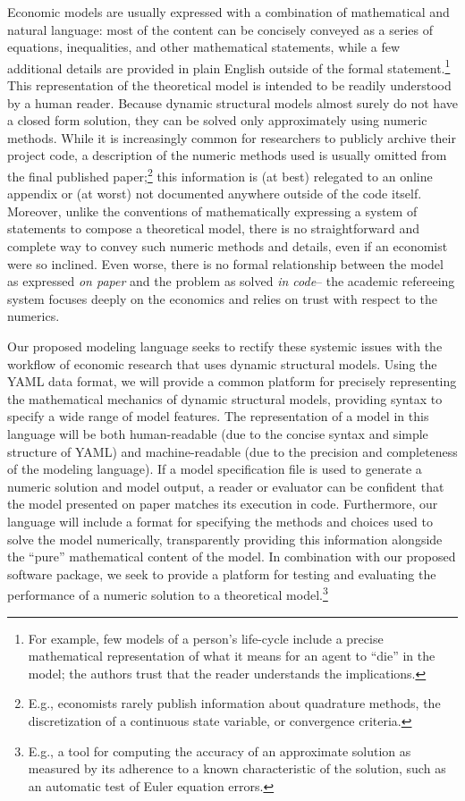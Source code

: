 \documentclass[12pt,pdftex,letterpaper]{article}
\begin{document}
Economic models are usually expressed with a combination of mathematical and natural language: most of the content can be concisely conveyed as a series of equations, inequalities, and other mathematical statements, while a few additional details are provided in plain English outside of the formal statement.\footnote{For example, few models of a person's life-cycle include a precise mathematical representation of what it means for an agent to ``die'' in the model; the authors trust that the reader understands the implications.} This representation of the theoretical model is intended to be readily understood by a human reader. Because dynamic structural models almost surely do not have a closed form solution, they can be solved only approximately using numeric methods. While it is increasingly common for researchers to publicly archive their project code, a description of the numeric methods used is usually omitted from the final published paper;\footnote{E.g., economists rarely publish information about quadrature methods, the discretization of a continuous state variable, or convergence criteria.} this information is (at best) relegated to an online appendix or (at worst) not documented anywhere outside of the code itself. Moreover, unlike the conventions of mathematically expressing a system of statements to compose a theoretical model, there is no straightforward and complete way to convey such numeric methods and details, even if an economist were so inclined. Even worse, there is no formal relationship between the model as expressed \textit{on paper} and the problem as solved \textit{in code}-- the academic refereeing system focuses deeply on the economics and relies on trust with respect to the numerics.

Our proposed modeling language seeks to rectify these systemic issues with the workflow of economic research that uses dynamic structural models. Using the YAML data format, we will provide a common platform for precisely representing the mathematical mechanics of dynamic structural models, providing syntax to specify a wide range of model features. The representation of a model in this language will be both human-readable (due to the concise syntax and simple structure of YAML) and machine-readable (due to the precision and completeness of the modeling language). If a model specification file is used to generate a numeric solution and model output, a reader or evaluator can be confident that the model presented on paper matches its execution in code. Furthermore, our language will include a format for specifying the methods and choices used to solve the model numerically, transparently providing this information alongside the ``pure'' mathematical content of the model. In combination with our proposed software package, we seek to provide a platform for testing and evaluating the performance of a numeric solution to a theoretical model.\footnote{E.g., a tool for computing the accuracy of an approximate solution as measured by its adherence to a known characteristic of the solution, such as an automatic test of Euler equation errors.}
\end{document}
